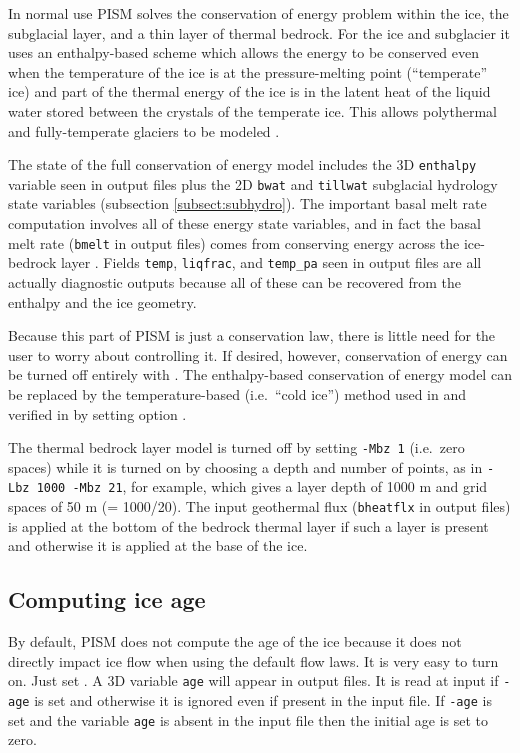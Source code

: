 In normal use PISM solves the conservation of energy problem within the ice, the subglacial layer, and a thin layer of thermal bedrock.  For the ice and subglacier it uses an enthalpy-based scheme \cite{AschwandenBuelerKhroulevBlatter} which allows the energy to be conserved even when the temperature of the ice is at the pressure-melting point (``temperate'' ice) and part of the thermal energy of the ice is in the latent heat of the liquid water stored between the crystals of the temperate ice.  This allows polythermal and fully-temperate glaciers to be modeled \cite{AschwandenBlatter}.

The state of the full conservation of energy model includes the 3D \texttt{enthalpy} variable seen in output files plus the 2D \texttt{bwat} and \texttt{tillwat} subglacial hydrology state variables (subsection \ref{subsect:subhydro}).  The important basal melt rate computation involves all of these energy state variables, and in fact the basal melt rate (\texttt{bmelt} in output files) comes from conserving energy across the ice-bedrock layer \cite{AschwandenBuelerKhroulevBlatter}.  Fields \texttt{temp}, \texttt{liqfrac}, and \texttt{temp_pa} seen in output files are all actually diagnostic outputs because all of these can be recovered from the enthalpy and the ice geometry.

Because this part of PISM is just a conservation law, there is little need for the user to worry about controlling it.  If desired, however, conservation of energy can be turned off entirely with .  The enthalpy-based conservation of energy model can be replaced by the temperature-based (i.e.~``cold ice'') method used in \cite{BBssasliding} and verified in \cite{BBL} by setting option .

The thermal bedrock layer model is turned off by setting \texttt{-Mbz 1} (i.e.~zero spaces) while it is turned on by choosing a depth and number of points, as in \texttt{-Lbz 1000 -Mbz 21}, for example, which gives a layer depth of 1000 m and grid spaces of 50 m (= 1000/20).  The input geothermal flux (\texttt{bheatflx} in output files) is applied at the bottom of the bedrock thermal layer if such a layer is present and otherwise it is applied at the base of the ice.


\subsection{Computing ice age} \label{subsect:age}

By default, PISM does not compute the age of the ice because it does not directly impact ice flow when using the default flow laws.  It is very easy to turn on.  Just set .  A 3D variable \texttt{age} will appear in output files.  It is read at input if \texttt{-age} is set and otherwise it is ignored even if present in the input file.  If \texttt{-age} is set and the variable \texttt{age} is absent in the input file then the initial age is set to zero.



